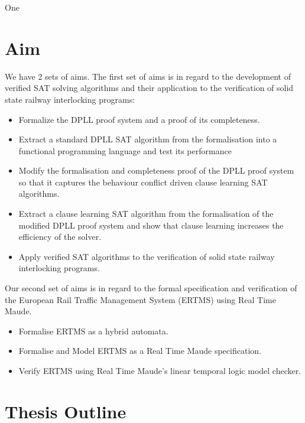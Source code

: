 One 


\section{Aim}
We have 2 sets of aims. The first set of aims is in regard to the development of verified SAT solving algorithms and their application to the verification of solid state railway interlocking programs: 


\medskip

\begin{itemize}

\item Formalize the DPLL proof system and a proof of its completeness.

\item Extract a standard DPLL SAT algorithm from the formalisation into a functional programming language and test its performance

\item Modify the formalisation and completeness proof  of the DPLL proof system so that it captures the behaviour conflict driven clause learning SAT algorithms.

\item Extract a clause learning SAT algorithm from the formalisation  of the modified DPLL proof system and show that clause learning increases the efficiency of the solver.

\item Apply verified SAT algorithms to the verification of solid state railway interlocking programs. 

\end{itemize}

Our second set of aims is in regard to the formal specification and verification of the European Rail Traffic Management System (ERTMS) using Real Time Maude.

\begin{itemize}

\item Formalise ERTMS as a hybrid automata.

\item Formalise and Model ERTMS as a Real Time Maude specification.

\item Verify ERTMS using Real Time Maude's linear temporal logic model checker.

\end{itemize}




\section{Thesis Outline}



